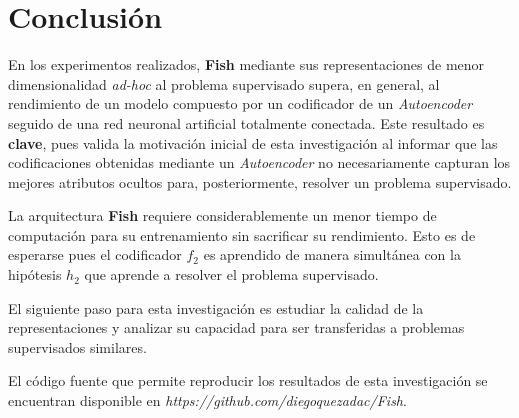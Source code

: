 \section{Conclusión}

En los experimentos realizados, \textbf{Fish} mediante sus representaciones de menor dimensionalidad \textit{ad-hoc} al problema supervisado supera, en general, al rendimiento de un modelo compuesto por un codificador de un \textit{Autoencoder} seguido de una red neuronal artificial totalmente conectada. Este resultado es \textbf{clave}, pues valida la motivación inicial de esta investigación al informar que las codificaciones obtenidas mediante un \textit{Autoencoder} no necesariamente capturan los mejores atributos ocultos para, posteriormente, resolver un problema supervisado.

La arquitectura \textbf{Fish} requiere considerablemente un menor tiempo de computación para su entrenamiento sin sacrificar su rendimiento. Esto es de esperarse pues el codificador $f_2$ es aprendido de manera simultánea con la hipótesis $h_2$ que aprende a resolver el problema supervisado.

El siguiente paso para esta investigación es estudiar la calidad de la representaciones y analizar su capacidad para ser transferidas a problemas supervisados similares.

El código fuente que permite reproducir los resultados de esta investigación se encuentran disponible en \emph{https://github.com/diegoquezadac/Fish}.